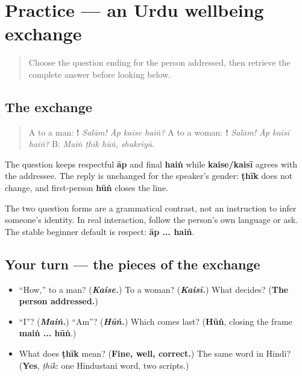 \section[Practice]{Practice — an Urdu wellbeing exchange}

\label{lesson:UR-C04-practice}



\begin{quote}
Choose the question ending for the person addressed, then retrieve the complete answer before looking below.
\end{quote}

\subsection*{The exchange}
\begin{quote}
A to a man: \textbf{!   } \emph{Salām! Āp kaise haiṅ?} A to a woman: \textbf{!   } \emph{Salām! Āp kaisī haiṅ?} B: \textbf{   } \emph{Maiṅ ṭhīk hūṅ, shukriyā.}
\end{quote}

The question keeps respectful \textbf{āp} and final \textbf{haiṅ} while \textbf{kaise/kaisī} agrees with the addressee. The reply is unchanged for the speaker's gender: \textbf{ṭhīk} does not change, and first-person \textbf{hūṅ} closes the line.

\begin{grammarlens}[title={Grammar Lens: separate grammar from guessing}]
The two question forms are a grammatical contrast, not an instruction to infer someone's identity. In real interaction, follow the person's own language or ask. The stable beginner default is respect: \textbf{āp ... haiṅ}.
\end{grammarlens}

\subsection*{Your turn — the pieces of the exchange}
\begin{itemize}
\raggedright
  \item \textquotedblleft{}How,\textquotedblright{} to a man? (\emph{\textbf{Kaise.}}) To a woman? (\emph{\textbf{Kaisī.}}) What decides? (\textbf{The person addressed.})
  \item \textquotedblleft{}I\textquotedblright{}? (\emph{\textbf{Maiṅ.}}) \textquotedblleft{}Am\textquotedblright{}? (\emph{\textbf{Hūṅ.}}) Which comes last? (\textbf{Hūṅ}, closing the frame \textbf{maiṅ ... hūṅ}.)
  \item What does \textbf{ṭhīk} mean? (\textbf{Fine, well, correct.}) The same word in Hindi? (\textbf{Yes}, \emph{ṭhīk}: one Hindustani word, two scripts.)
\end{itemize}

